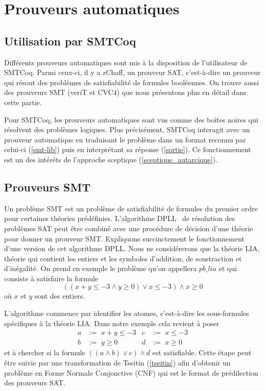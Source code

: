 \documentclass[11pt]{article}
\begin{document}
\newpage
\section{Prouveurs automatiques} \label{fonctionnement_prouveurs}

\subsection{Utilisation par SMTCoq}

Différents prouveurs automatiques sont mis à la disposition de l'utilisateur de SMTCoq. Parmi ceux-ci, il y a zChaff, un prouveur SAT, c'est-à-dire un prouveur qui résout des problèmes de satisfiabilité de formules booléennes. On trouve aussi des prouveurs SMT (veriT et CVC4) que nous présentons plus en détail dans cette partie.\medbreak 

Pour SMTCoq, les prouveurs automatiques sont vus comme des boîtes noires qui résolvent des problèmes logiques. Plus précisément, SMTCoq interagit avec un prouveur automatique en traduisant le problème dans un format reconnu par celui-ci (\ref{smt-lib}) puis en interprétant sa réponse (\ref{sortie}). Ce fonctionnement est un des intérêts de l'approche sceptique (\ref{sceptique_autarcique}).

\subsection{Prouveurs SMT} \label{smt}

Un problème SMT est un problème de satisfiabilité de formules du premier ordre pour certaines théories prédéfinies. L'algorithme DPLL~\cite{dpll} de résolution des problèmes SAT peut être combiné avec une procédure de décision d'une théorie pour donner un prouveur SMT. Expliquons succinctement le fonctionnement d'une version de cet algorithme DPLL. Nous ne considérerons que la théorie LIA, théorie qui contient les entiers et les symboles d'addition, de soustraction et d'inégalité. On prend en exemple le problème qu'on appellera $pb\_lia$ et qui consiste à satisfaire la formule \[((x + y \leq -3 \wedge y \geq 0) \vee x \leq -3) \wedge x \geq 0\] où $x$ et $y$ sont des entiers. \medbreak

L'algorithme commence par identifier les atomes, c'est-à-dire les sous-formules spécifiques à la théorie LIA. Dans notre exemple cela revient à poser 
\begin{align*}
a &:= \,\, x + y \leq -3 & c &:= \,\,x \leq -3 \\
b &:=\,\, y \geq 0 & d &:= \,\,x \geq 0
\end{align*}
et à chercher si la formule  $((a \wedge b) \vee c) \wedge d$ est satisfiable. Cette étape peut être suivie par une transformation de Tseitin (\ref{tseitin}) afin d'obtenir un problème en Forme Normale Conjonctive (CNF) qui est le format de prédilection des prouveurs SAT. \medbreak
\end{document}
